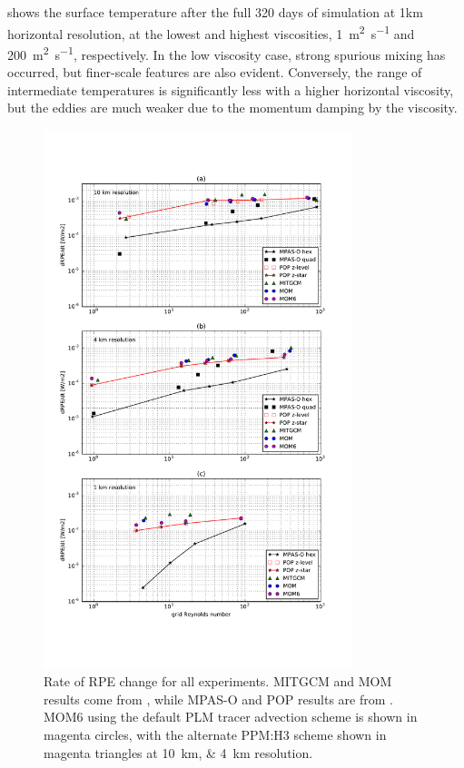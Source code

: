  shows the surface temperature after the full 320 days of simulation at 1km horizontal resolution, at the lowest and highest viscosities, \SI{1}{\square\metre\per\second} and \SI{200}{\square\metre\per\second}, respectively. In the low viscosity case, strong spurious mixing has occurred, but finer-scale features are also evident. Conversely, the range of intermediate temperatures is significantly less with a higher horizontal viscosity, but the eddies are much weaker due to the momentum damping by the viscosity.

\begin{figure}
  \includegraphics[width=0.8\textwidth]{../plots/eddies_drpe.pdf}
  \caption{\label{fig:eddies-drpe} Rate of RPE change for all experiments. MITGCM and MOM results come from \citet{ilicak12}, while MPAS-O and POP results are from \citet{petersen15}. MOM6 using the default PLM tracer advection scheme is shown in magenta circles, with the alternate PPM:H3 scheme shown in magenta triangles at \SIlist{10;4}{\kilo\metre} resolution.}
\end{figure}

